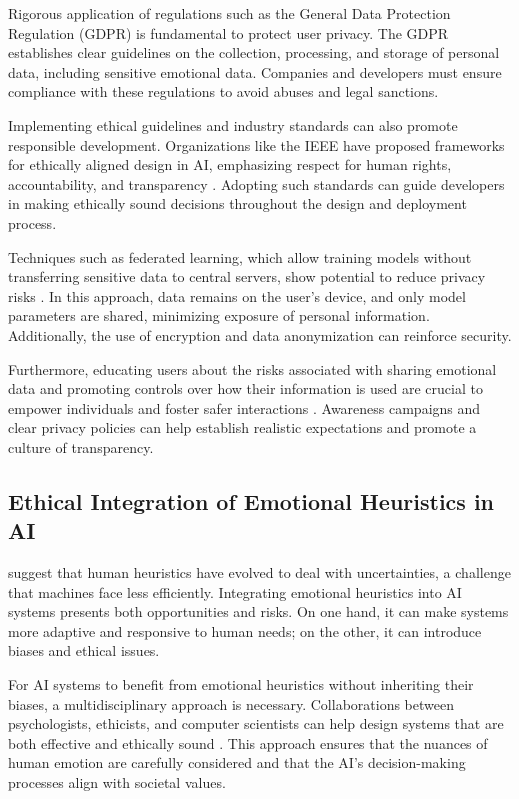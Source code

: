 \documentclass[a4paper,12pt]{report}
\begin{document}
	Rigorous application of regulations such as the General Data Protection Regulation (GDPR) is fundamental to protect user privacy. The GDPR establishes clear guidelines on the collection, processing, and storage of personal data, including sensitive emotional data. Companies and developers must ensure compliance with these regulations to avoid abuses and legal sanctions.
	
	Implementing ethical guidelines and industry standards can also promote responsible development. Organizations like the IEEE have proposed frameworks for ethically aligned design in AI, emphasizing respect for human rights, accountability, and transparency \parencite{ieee2019}. Adopting such standards can guide developers in making ethically sound decisions throughout the design and deployment process.
	
	Techniques such as federated learning, which allow training models without transferring sensitive data to central servers, show potential to reduce privacy risks \parencite{pessoa2008}. In this approach, data remains on the user's device, and only model parameters are shared, minimizing exposure of personal information. Additionally, the use of encryption and data anonymization can reinforce security.
	
	Furthermore, educating users about the risks associated with sharing emotional data and promoting controls over how their information is used are crucial to empower individuals and foster safer interactions \parencite{slovic2007}. Awareness campaigns and clear privacy policies can help establish realistic expectations and promote a culture of transparency.
	
	\subsection{Ethical Integration of Emotional Heuristics in AI}
	
	\textcite{gigerenzer2009} suggest that human heuristics have evolved to deal with uncertainties, a challenge that machines face less efficiently. Integrating emotional heuristics into AI systems presents both opportunities and risks. On one hand, it can make systems more adaptive and responsive to human needs; on the other, it can introduce biases and ethical issues.
	
	For AI systems to benefit from emotional heuristics without inheriting their biases, a multidisciplinary approach is necessary. Collaborations between psychologists, ethicists, and computer scientists can help design systems that are both effective and ethically sound \parencite{russell2020}. This approach ensures that the nuances of human emotion are carefully considered and that the AI's decision-making processes align with societal values.
	
\end{document}
